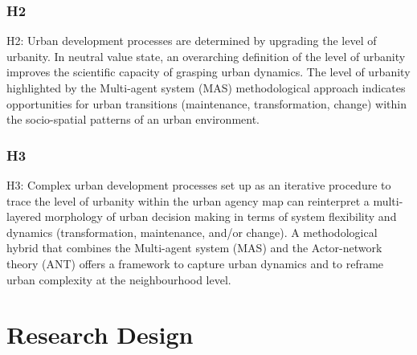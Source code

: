 \documentclass[11pt]{report}
\begin{document}
\subsubsection{H2}

H2:  Urban development processes are determined  by  upgrading the  level  of  urbanity.  In neutral value state, an overarching definition of the level of urbanity improves the scientific capacity of grasping urban dynamics. The level of urbanity highlighted by the Multi-agent system (MAS) methodological approach indicates opportunities for urban transitions (maintenance, transformation, change) within the socio-spatial patterns of an urban environment. 

\subsubsection{H3}

H3: Complex urban development processes set up as an iterative procedure to trace the level of urbanity within the urban agency map can reinterpret a multi-layered morphology of urban decision making in terms of system flexibility and dynamics (transformation, maintenance, and/or change). A methodological hybrid that combines the Multi-agent system (MAS) and the Actor-network theory (ANT) offers a framework to capture urban dynamics and to reframe urban complexity at the neighbourhood level.

\section{Research Design}
\end{document}
